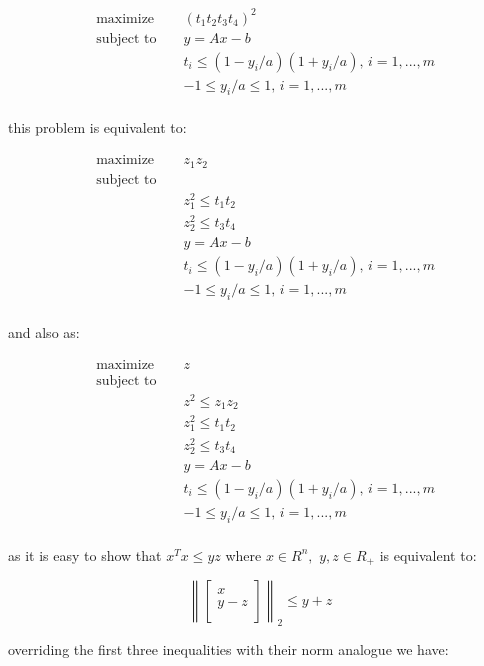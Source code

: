 \documentclass{article}
\begin{document}
\begin{align*}
&\text{maximize } && (t_1 t_2 t_3 t_4)^2 \\
&\text{subject to } && y = A x - b \\
& && t_i \leq (1 - y_i / a)(1 + y_i / a),
\, i = 1, ..., m\\
& && -1 \leq y_i / a \leq 1, \, i = 1, ..., m\\
\end{align*}

this problem is equivalent to:

\begin{align*}
&\text{maximize } && z_1 z_2 \\
&\text{subject to } && \\
& && z_1^2 \leq t_1 t_2 \\
& && z_2^2 \leq t_3 t_4 \\
& && y = A x - b \\
& && t_i \leq (1 - y_i / a)(1 + y_i / a),
\, i = 1, ..., m\\
& && -1 \leq y_i / a \leq 1, \, i = 1, ..., m\\
\end{align*}

and also as:

\begin{align*}
&\text{maximize } && z \\
&\text{subject to } && \\
& && z^2 \leq z_1 z_2\\
& && z_1^2 \leq t_1 t_2 \\
& && z_2^2 \leq t_3 t_4 \\
& && y = A x - b \\
& && t_i \leq (1 - y_i / a)(1 + y_i / a),
\, i = 1, ..., m\\
& && -1 \leq y_i / a \leq 1, \, i = 1, ..., m\\
\end{align*}

as it is easy to show that $x^T x \leq yz$ where 
$x \in R^n, $ $y, z \in R_+$ is equivalent to:

$$
\left\lVert
\begin{bmatrix}
	x \\ y - z\\
\end{bmatrix}
\right\rVert_2 \leq y + z
$$

overriding the first three inequalities with their norm analogue we have:
\end{document}
